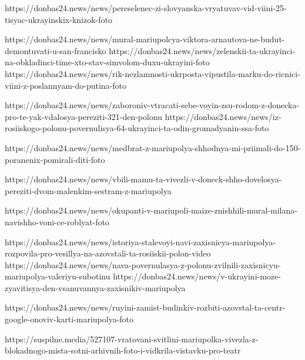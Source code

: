 https://donbas24.news/news/pereselenec-zi-slovyanska-vryatuvav-vid-viini-25-tisyac-ukrayinskix-knizok-foto

https://donbas24.news/news/mural-mariupolcya-viktora-arnautova-ne-budut-demontuvati-u-san-francisko
https://donbas24.news/news/zelenskii-ta-ukrayinci-na-obkladinci-time-xto-stav-simvolom-duxu-ukrayini-foto
https://donbas24.news/news/rik-nezlamnosti-ukrposta-vipustila-marku-do-ricnici-viini-z-poslannyam-do-putina-foto

https://donbas24.news/news/zaboroniv-vtracati-sebe-voyin-zsu-rodom-z-donecka-pro-te-yak-vdalosya-pereziti-321-den-polonu
https://donbas24.news/news/iz-rosiiskogo-polonu-povernulisya-64-ukrayinci-ta-odin-gromadyanin-ssa-foto

https://donbas24.news/news/medbrat-z-mariupolya-shhodnya-mi-priimali-do-150-poranenix-pomirali-diti-foto

https://donbas24.news/news/vbili-mamu-ta-vivezli-v-doneck-shho-dovelosya-pereziti-dvom-malenkim-sestram-z-mariupolya

https://donbas24.news/news/okupanti-v-mariupoli-maize-znishhili-mural-milana-navishho-voni-ce-roblyat-foto

https://donbas24.news/news/istoriya-stalevoyi-navi-zaxisnicya-mariupolya-rozpovila-pro-vesillya-na-azovstali-ta-rosiiskii-polon-video
https://donbas24.news/news/nava-povernulasya-z-polonu-zvilnili-zaxisnicyu-mariupolya-valeriyu-subotinu
https://donbas24.news/news/v-ukrayini-moze-zyavitisya-den-vsanuvannya-zaxisnikiv-mariupolya

https://donbas24.news/news/ruyini-zamist-budinkiv-rozbiti-azovstal-ta-centr-google-onoviv-karti-mariupolya-foto


https://suspilne.media/527107-vratovani-svitlini-mariupolka-vivezla-z-blokadnogo-mista-sotni-arhivnih-foto-i-vidkrila-vistavku-pro-teatr

